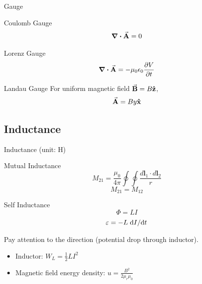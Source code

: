 \documentclass{beamer}
\begin{document}
\begin{frame}{Gauge}
    \begin{block}{Coulomb Gauge}
        \begin{equation*}
            \div\va{A} = 0
        \end{equation*}
    \end{block}

    \begin{block}{Lorenz Gauge}
        \begin{equation*}
            \div \va{A} = -\mu_0\epsilon_0\pdv{V}{t}
        \end{equation*}
    \end{block}

    \begin{block}{Landau Gauge}
        For uniform magnetic field $\va{B} = B \vu{z}$,
        \begin{equation*}
            \va{A} = By \vu{x}
        \end{equation*}
    \end{block}
\end{frame}

\subsection{Inductance}

\begin{frame}{Inductance (unit: H)}
    \begin{block}{Mutual Inductance}
        \begin{equation}
            M_{21}=\frac{\mu_{0}}{4 \pi} \oint \oint \frac{d \mathbf{l}_{1} \cdot d \mathbf{l}_{2}}{r}
        \end{equation}
        \begin{equation}
            M_{21} = M_{12}
        \end{equation}
    \end{block}

    \begin{block}{Self Inductance}
        \begin{equation}
            \Phi = L I
        \end{equation}
        \begin{equation}
            \varepsilon = - L \dv*{I}{t}
        \end{equation}

        Pay attention to the direction (potential drop through inductor).
    \end{block}

    \begin{itemize}
        \item Inductor: $W_L = \frac{1}{2} L I^2$
        \item Magnetic field energy density: $u = \frac{B^2}{2 \mu_r\mu_0}$
    \end{itemize}
\end{frame}
\end{document}
